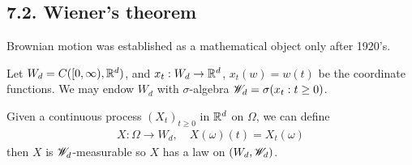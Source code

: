 \documentclass[12pt,a4paper]{report}
\begin{document}
\subsection*{7.2. Wiener's theorem}

Brownian motion was established as a mathematical object only after 1920's.
\s

Let $W_d = C([0,\infty), \mathbb{R}^d)$, and $x_t : W_d \rightarrow \mathbb{R}^d$, $x_t(w) = w(t)$ be the coordinate functions. We may endow $W_d$ with $\sigma$-algebra $\mathscr{W}_d = \sigma(x_t:t\geq 0)$. 
\s

Given a continuous process $(X_t)_{t\geq 0}$ in $\mathbb{R}^d$ on $\Omega$, we can define 
\begin{align*}
X : \Omega \rightarrow W_d, \quad X(\omega)(t) = X_t(\omega)
\end{align*}
then $X$ is $\mathscr{W}_d$-measurable so $X$ has a law on $(W_d, \mathscr{W}_d)$.
\s
\end{document}

